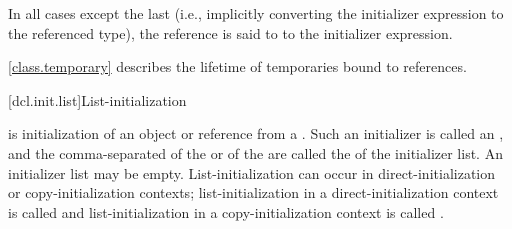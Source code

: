 In all cases except the last
(i.e., implicitly converting the initializer expression
to the referenced type),
the reference is said to  to the
initializer expression.

\pnum
\begin{note}
\ref{class.temporary} describes the lifetime of temporaries bound to references.
\end{note}

[dcl.init.list]{List-initialization}%

\pnum
{} is initialization of an object or reference from a
.
Such an initializer is called an , and
the comma-separated
of the 
or
of the 
are called the  of the initializer list. An initializer list may be empty.
List-initialization can occur in direct-initialization or copy-initialization contexts;
list-initialization in a direct-initialization context is called
 and list-initialization in a
copy-initialization context is called .
